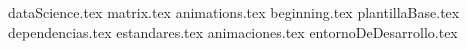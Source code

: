 \documentclass[11pt,oneside]{book}%
\begin{document}
	\maketitle
	{dataScience.tex}
	{matrix.tex}
	{animations.tex}
	\frontmatter
		\tableofcontents
		{beginning.tex} 
	\mainmatter
	{plantillaBase.tex}
	{dependencias.tex}
	{estandares.tex}
	{animaciones.tex}
	{entornoDeDesarrollo.tex}
	\printCompilationInfo
\end{document}
